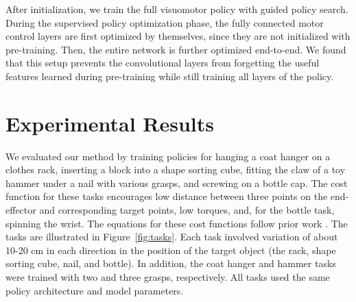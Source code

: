 \documentclass[conference]{IEEEtran}
\begin{document}
After initialization, we train the full visuomotor policy with guided policy search. During the supervised policy optimization phase, the fully connected motor control layers are first optimized by themselves, since they are not initialized with pre-training. Then, the entire network is further optimized end-to-end. We found that this setup prevents the convolutional layers from forgetting the useful features learned during pre-training while still training all layers of the policy.

\section{Experimental Results}
\label{sec:results}

We evaluated our method by training policies for hanging a coat hanger on a clothes rack, inserting a block into a shape sorting cube, fitting the claw of a toy hammer under a nail with various grasps, and screwing on a bottle cap. The cost function for these tasks encourages low distance between three points on the end-effector and corresponding target points, low torques, and, for the bottle task, spinning the wrist. The equations for these cost functions follow prior work \cite{lwa-lnnpg-15}. The tasks are illustrated in Figure~\ref{fig:tasks}. Each task involved variation of about 10-20 cm in each direction in the position of the target object (the rack, shape sorting cube, nail, and bottle). In addition, the coat hanger and hammer tasks were trained with two and three grasps, respectively. All tasks used the same policy architecture and model parameters.
\end{document}
